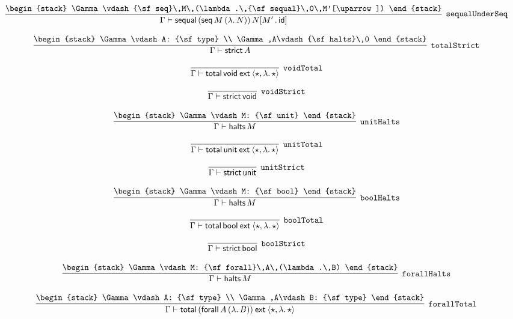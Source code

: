 \[
\infer[{\tt sequalUnderSeq}]{\Gamma \vdash {\sf sequal}\,({\sf seq}\,M\,(\lambda .\,N))\,N[M'\,.\,{\sf id}]}{
\begin{stack}
\Gamma \vdash {\sf seq}\,M\,(\lambda .\,{\sf sequal}\,0\,M'[\uparrow ])
\end{stack}}
\]

\[
\infer[{\tt totalStrict}]{\Gamma \vdash {\sf strict}\,A}{
\begin{stack}
\Gamma \vdash A: {\sf type}
\\
\Gamma ,A\vdash {\sf halts}\,0
\end{stack}}
\]

\[
\infer[{\tt voidTotal}]{\Gamma \vdash {\sf total}\,{\sf void}\:{\sf ext}\:\langle \star ,\lambda .\,\star \rangle }{}
\]

\[
\infer[{\tt voidStrict}]{\Gamma \vdash {\sf strict}\,{\sf void}}{}
\]

\[
\infer[{\tt unitHalts}]{\Gamma \vdash {\sf halts}\,M}{
\begin{stack}
\Gamma \vdash M: {\sf unit}
\end{stack}}
\]

\[
\infer[{\tt unitTotal}]{\Gamma \vdash {\sf total}\,{\sf unit}\:{\sf ext}\:\langle \star ,\lambda .\,\star \rangle }{}
\]

\[
\infer[{\tt unitStrict}]{\Gamma \vdash {\sf strict}\,{\sf unit}}{}
\]

\[
\infer[{\tt boolHalts}]{\Gamma \vdash {\sf halts}\,M}{
\begin{stack}
\Gamma \vdash M: {\sf bool}
\end{stack}}
\]

\[
\infer[{\tt boolTotal}]{\Gamma \vdash {\sf total}\,{\sf bool}\:{\sf ext}\:\langle \star ,\lambda .\,\star \rangle }{}
\]

\[
\infer[{\tt boolStrict}]{\Gamma \vdash {\sf strict}\,{\sf bool}}{}
\]

\[
\infer[{\tt forallHalts}]{\Gamma \vdash {\sf halts}\,M}{
\begin{stack}
\Gamma \vdash M: {\sf forall}\,A\,(\lambda .\,B)
\end{stack}}
\]

\[
\infer[{\tt forallTotal}]{\Gamma \vdash {\sf total}\,({\sf forall}\,A\,(\lambda .\,B))\:{\sf ext}\:\langle \star ,\lambda .\,\star \rangle }{
\begin{stack}
\Gamma \vdash A: {\sf type}
\\
\Gamma ,A\vdash B: {\sf type}
\end{stack}}
\]

